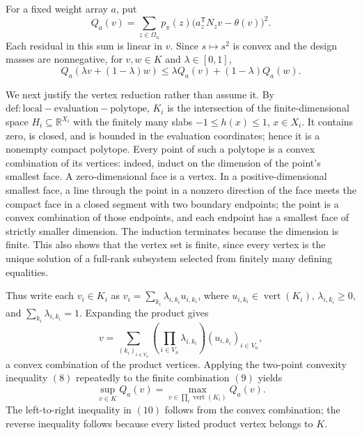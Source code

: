 For a fixed weight array \(a\), put
\[
 Q_a(v)=\sum_{z\in\Omega_n}p_\pi(z)
 \bigl(a_z^{\mathsf T}N_zv-\theta(v)\bigr)^2.
\]
Each residual in this sum is linear in \(v\).  Since \(s\mapsto s^2\) is convex and the design masses are nonnegative, for \(v,w\in K\) and \(\lambda\in[0,1]\),
\[
 Q_a(\lambda v+(1-\lambda)w)
 \le \lambda Q_a(v)+(1-\lambda)Q_a(w).                                           \tag{8}
\]

We next justify the vertex reduction rather than assume it.  By \(\mathrm{def:local-evaluation-polytope}\), \(K_i\) is the intersection of the finite-dimensional space \(H_i\subseteq\mathbb R^{X_i}\) with the finitely many slabs \(-1\le h(x)\le1\), \(x\in X_i\).  It contains zero, is closed, and is bounded in the evaluation coordinates; hence it is a nonempty compact polytope.  Every point of such a polytope is a convex combination of its vertices: indeed, induct on the dimension of the point's smallest face.  A zero-dimensional face is a vertex.  In a positive-dimensional smallest face, a line through the point in a nonzero direction of the face meets the compact face in a closed segment with two boundary endpoints; the point is a convex combination of those endpoints, and each endpoint has a smallest face of strictly smaller dimension.  The induction terminates because the dimension is finite.  This also shows that the vertex set is finite, since every vertex is the unique solution of a full-rank subsystem selected from finitely many defining equalities.

Thus write each \(v_i\in K_i\) as \(v_i=\sum_{k_i}\lambda_{i,k_i}u_{i,k_i}\), where \(u_{i,k_i}\in\operatorname{vert}(K_i)\), \(\lambda_{i,k_i}\ge0\), and \(\sum_{k_i}\lambda_{i,k_i}=1\).  Expanding the product gives
\[
 v=\sum_{(k_i)_{i\in V_n}}
 \left(\prod_{i\in V_n}\lambda_{i,k_i}\right)
 (u_{i,k_i})_{i\in V_n},                                                         \tag{9}
\]
a convex combination of the product vertices.  Applying the two-point convexity inequality \((8)\) repeatedly to the finite combination \((9)\) yields
\[
 \sup_{v\in K}Q_a(v)
 =\max_{v\in\prod_i\operatorname{vert}(K_i)}Q_a(v).                              \tag{10}
\]
The left-to-right inequality in \((10)\) follows from the convex combination; the reverse inequality follows because every listed product vertex belongs to \(K\).

